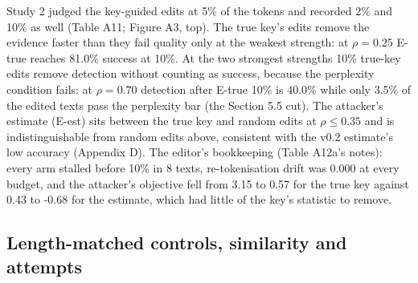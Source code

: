 \documentclass[11pt,letterpaper]{article}
\begin{document}
Study 2 judged the key-guided edits at 5\% of the tokens and recorded 2\% and 10\% as well (Table A11; Figure A3, top). The true key's edits remove the evidence faster than they fail quality only at the weakest strength: at \(\rho = 0.25\) E-true reaches 81.0\% success at 10\%. At the two strongest strengths 10\% true-key edits remove detection without counting as success, because the perplexity condition fails: at \(\rho = 0.70\) detection after E-true 10\% is 40.0\% while only 3.5\% of the edited texts pass the perplexity bar (the Section 5.5 cut). The attacker's estimate (E-est) sits between the true key and random edits at \(\rho \leq 0.35\) and is indistinguishable from random edits above, consistent with the v0.2 estimate's low accuracy (Appendix D). The editor's bookkeeping (Table A12a's notes): every arm stalled before 10\% in 8 texts, re-tokenisation drift was 0.000 at every budget, and the attacker's objective fell from 3.15 to 0.57 for the true key against 0.43 to -0.68 for the estimate, which had little of the key's statistic to remove.

\hypertarget{length-matched-controls-similarity-and-attempts}{%
\subsection{Length-matched controls, similarity and attempts}\label{length-matched-controls-similarity-and-attempts}}
\end{document}
